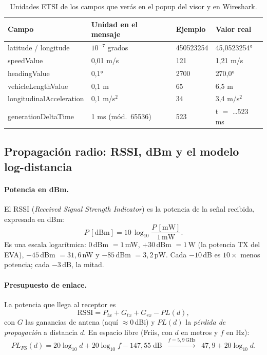 \documentclass[11pt,a4paper]{article}
\begin{document}
\begin{table}[h!]
\centering\small
\begin{tabular}{@{}llll@{}}
\toprule
\textbf{Campo} & \textbf{Unidad en el mensaje} & \textbf{Ejemplo} & \textbf{Valor real} \\
\midrule
latitude / longitude & $10^{-7}$ grados & 450523254 & 45,0523254° \\
speedValue & 0,01 m/s & 121 & 1,21 m/s \\
headingValue & 0,1° & 2700 & 270,0° \\
vehicleLengthValue & 0,1 m & 65 & 6,5 m \\
longitudinalAcceleration & 0,1 m/s$^2$ & 34 & 3,4 m/s$^2$ \\
generationDeltaTime & 1 ms (mód.\ 65536) & 523 & t $=$ \ldots{}523 ms \\
\bottomrule
\end{tabular}
\caption{Unidades ETSI de los campos que verás en el popup del visor y en Wireshark.}
\label{tab:unidades}
\end{table}

\subsection{Propagación radio: RSSI, dBm y el modelo log-distancia}
\label{sec:rssi}

\paragraph{Potencia en dBm.} El RSSI (\emph{Received Signal Strength
Indicator}) es la potencia de la señal recibida, expresada en dBm:
\[ P\,[\mathrm{dBm}] = 10\,\log_{10}\!\frac{P\,[\mathrm{mW}]}{1\,\mathrm{mW}}. \]
Es una escala logarítmica: $0$\,dBm $=1$\,mW, $+30$\,dBm $=1$\,W (la potencia
TX del EVA), $-45$\,dBm $=31{,}6$\,nW y $-85$\,dBm $=3{,}2$\,pW. Cada
$-10$\,dB es $10\times$ menos potencia; cada $-3$\,dB, la mitad.

\paragraph{Presupuesto de enlace.} La potencia que llega al receptor es
\[ \mathrm{RSSI} = P_{tx} + G_{tx} + G_{rx} - PL(d), \]
con $G$ las ganancias de antena (aquí $\approx 0$\,dBi) y $PL(d)$ la
\emph{pérdida de propagación} a distancia $d$. En espacio libre (Friis, con
$d$ en metros y $f$ en Hz):
\[ PL_{FS}(d) = 20\log_{10} d + 20\log_{10} f - 147{,}55 \;\mathrm{dB}
   \;\;\xrightarrow{f=5{,}9\,\mathrm{GHz}}\;\; 47{,}9 + 20\log_{10} d. \]
\end{document}
